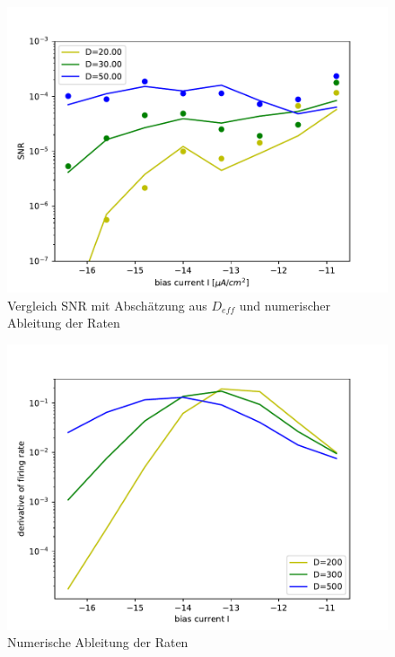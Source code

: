 \documentclass[12pt,a4paper]{article}
\begin{document}
\begin{figure}[H]
	\centering
	\includegraphics[scale=1]{snrangerealrinzelcomp.pdf}\caption{Vergleich SNR mit Abschätzung aus $D_{eff}$ und numerischer Ableitung der Raten}
	\label{snrinzelcomp}
\end{figure}
\begin{figure}[H]
	\centering
	\includegraphics[scale=1]{drdirinzel.pdf}\caption{Numerische Ableitung der Raten}
	\label{drdirin}
\end{figure}
\end{document}
